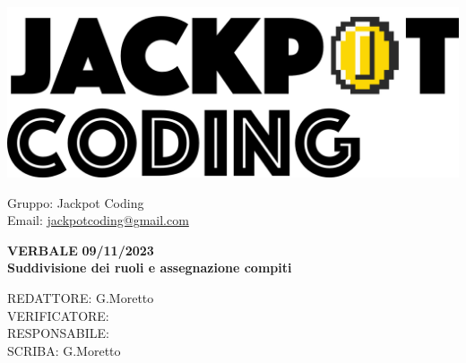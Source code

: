 \documentclass[5pt]{article}
\begin{document}
\begin{minipage}[t]{0.50\textwidth}
    \begin{flushleft}
        \hspace{10pt}
        \includegraphics[scale=0.65]{../../assets/jackpot-logo.png} 
    \end{flushleft}
\end{minipage}
\hspace{-60pt} %
\begin{flushright}
    \begin{minipage}[t]{0.50\textwidth}
        \begin{flushright}
            Gruppo: {\Large Jackpot Coding}\\
            Email: \href{mailto:jackpotcoding@gmail.com}{jackpotcoding@gmail.com}
        \end{flushright}
    \end{minipage}
\end{flushright}

\vspace{24pt}

\begin{center}
    \textbf{\large VERBALE }
    \textbf{\large 09/11/2023} \\
    \textbf{\LARGE Suddivisione dei ruoli e assegnazione compiti}
\end{center}

\vspace{13pt}

\begin{flushleft}
    \begin{spacing}{1.5}
        REDATTORE:  G.Moretto \\%
        VERIFICATORE:   \\%
        RESPONSABILE:   \\%
        \vspace{7pt}
        SCRIBA: G.Moretto\\%
    \end{spacing}
\end{flushleft}
\end{document}
